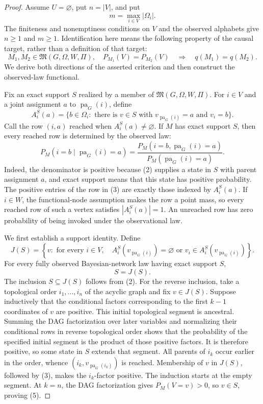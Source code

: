 \documentclass{article}
\begin{document}
\begin{proof}
Assume \(U=\varnothing\), put \(n=|V|\), and put
\[
 m=\max_{i\in V}|\Omega_i|.
\]
The finiteness and nonemptiness conditions on \(V\) and the observed alphabets give \(n\geq 1\) and \(m\geq 1\).  Identification here means the following property of the causal target, rather than a definition of that target:
\[
 M_1,M_2\in\mathfrak M(G,\Omega,W,\Pi),\quad
 P_{M_1}(V)=P_{M_2}(V)
 \quad\Longrightarrow\quad q(M_1)=q(M_2).
 \tag{1}
\]
We derive both directions of the asserted criterion and then construct the observed-law functional.

Fix an exact support \(S\) realized by a member of \(\mathfrak M(G,\Omega,W,\Pi)\).  For \(i\in V\) and a joint assignment \(a\) to \(\operatorname{pa}_G(i)\), define
\[
 A_i^S(a)=\bigl\{b\in\Omega_i:\text{ there is }v\in S
 \text{ with }v_{\operatorname{pa}_G(i)}=a\text{ and }v_i=b\bigr\}.
 \tag{2}
\]
Call the row \((i,a)\) reached when \(A_i^S(a)\neq\varnothing\).  If \(M\) has exact support \(S\), then every reached row is determined by the observed law:
\[
 P_M(i=b\mid \operatorname{pa}_G(i)=a)
 =\frac{P_M(i=b,\operatorname{pa}_G(i)=a)}
 {P_M(\operatorname{pa}_G(i)=a)}.
 \tag{3}
\]
Indeed, the denominator is positive because (2) supplies a state in \(S\) with parent assignment \(a\), and exact support means that this state has positive probability.  The positive entries of the row in (3) are exactly those indexed by \(A_i^S(a)\).  If \(i\in W\), the functional-node assumption makes the row a point mass, so every reached row of such a vertex satisfies \(|A_i^S(a)|=1\).  An unreached row has zero probability of being invoked under the observational law.

We first establish a support identity.  Define
\[
 J(S)=\left\{v:\text{ for every }i\in V,\quad
 A_i^S(v_{\operatorname{pa}_G(i)})=\varnothing
 \text{ or }v_i\in A_i^S(v_{\operatorname{pa}_G(i)})\right\}.
 \tag{4}
\]
For every fully observed Bayesian-network law having exact support \(S\),
\[
 S=J(S).
 \tag{5}
\]
The inclusion \(S\subseteq J(S)\) follows from (2).  For the reverse inclusion, take a topological order \(i_1,\ldots,i_n\) of the acyclic graph and fix \(v\in J(S)\).  Suppose inductively that the conditional factors corresponding to the first \(k-1\) coordinates of \(v\) are positive.  This initial topological segment is ancestral.  Summing the DAG factorization over later variables and normalizing their conditional rows in reverse topological order shows that the probability of the specified initial segment is the product of those positive factors.  It is therefore positive, so some state in \(S\) extends that segment.  All parents of \(i_k\) occur earlier in the order, whence \((i_k,v_{\operatorname{pa}_G(i_k)})\) is reached.  Membership of \(v\) in \(J(S)\), followed by (3), makes the \(i_k\)-factor positive.  The induction starts at the empty segment.  At \(k=n\), the DAG factorization gives \(P_M(V=v)>0\), so \(v\in S\), proving (5).


\end{proof}
\end{document}
